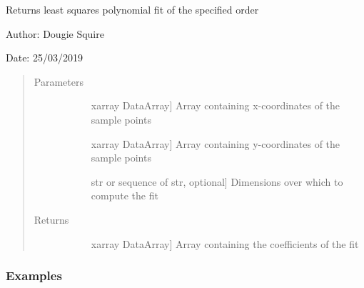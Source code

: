 \documentclass[letterpaper,10pt,english]{sphinxmanual}
\begin{document}

\begin{fulllineitems}
\label{\detokenize{utils_doc:utils.polyfit}}
Returns least squares polynomial fit of the specified order

\begin{DUlineblock}{0em}
\item[] Author: Dougie Squire
\item[] Date: 25/03/2019
\end{DUlineblock}
\begin{quote}\begin{description}
\item[{Parameters}] \leavevmode\begin{description}
\item[{}] \leavevmode{[}xarray DataArray{]}
Array containing x-coordinates of the sample points

\item[{}] \leavevmode{[}xarray DataArray{]}
Array containing y-coordinates of the sample points

\item[{}] \leavevmode{[}str or sequence of str, optional{]}
Dimensions over which to compute the fit

\end{description}

\item[{Returns}] \leavevmode\begin{description}
\item[{}] \leavevmode{[}xarray DataArray{]}
Array containing the coefficients of the fit

\end{description}

\end{description}\end{quote}






\subsubsection*{Examples}


\end{fulllineitems}
\end{document}
